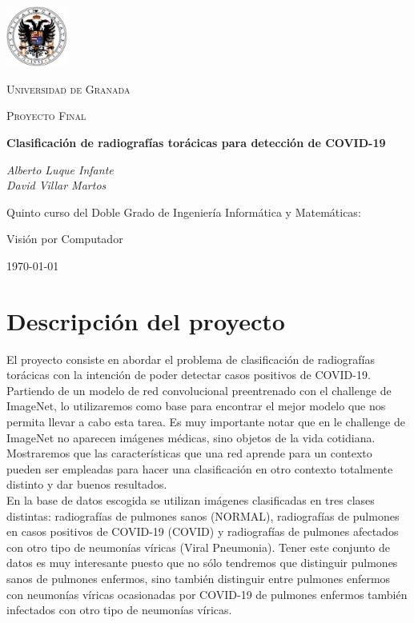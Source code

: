\documentclass[11pt,a4paper]{article}
\theoremstyle{definition}
\begin{document}
\begin{titlepage}
  \centering
 \includegraphics[width=0.15\textwidth]{./images/exp.jpg}\par\vspace{1cm}
  {\scshape\LARGE Universidad de Granada  \par}
  \vspace{1cm}
  {\scshape Proyecto Final\par}
  \vspace{1.5cm}
  {\huge\bfseries  Clasificación de radiografías torácicas para detección de COVID-19\par}
  \vspace{2cm}
  {\Large\itshape Alberto Luque Infante\\David Villar Martos\par}
  \vfill
  Quinto curso del Doble Grado de Ingeniería Informática y Matemáticas:\par
  Visión por Computador

  \vfill

  {\large \today\par}
\end{titlepage}

\tableofcontents
\newpage
\section{Descripción del proyecto}

El proyecto consiste en abordar el problema de clasificación de radiografías torácicas con la intención de poder detectar casos positivos de COVID-19.\\

Partiendo de un modelo de red convolucional preentrenado con el challenge de  ImageNet, lo utilizaremos como base para encontrar el mejor modelo que nos permita llevar a cabo esta tarea. Es muy importante notar que en le challenge de ImageNet no aparecen imágenes médicas, sino objetos de la vida cotidiana. Mostraremos que las características que una red aprende para un contexto pueden ser empleadas para hacer una clasificación en otro contexto totalmente distinto y dar buenos resultados. \\

En la base de datos escogida se utilizan imágenes clasificadas en tres clases distintas: radiografías de pulmones sanos (NORMAL), radiografías de pulmones en casos positivos de COVID-19 (COVID) y radiografías de pulmones afectados con otro tipo de neumonías víricas (Viral Pneumonia). Tener este conjunto de datos es muy interesante puesto que no sólo tendremos que distinguir pulmones sanos de pulmones enfermos, sino también distinguir entre pulmones enfermos con neumonías víricas ocasionadas por COVID-19 de pulmones enfermos también infectados con otro tipo de neumonías víricas.\\
\end{document}
